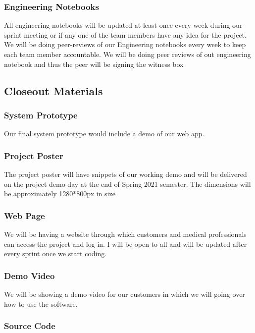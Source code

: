 \subsubsection{Engineering Notebooks}

All engineering notebooks will be updated at least once every week during our sprint meeting or if any one of the team members have any idea for the project. We will be doing peer-reviews of our Engineering notebooks every week to keep each team member accountable. We will be doing peer reviews of out engineering notebook and thus the peer will be signing the witness box
\subsection{Closeout Materials}

\subsubsection{System Prototype}
Our final system prototype would include a demo of our web app. 


\subsubsection{Project Poster}
The project poster will have snippets of our working demo and will be delivered on the project demo day at the end of Spring 2021 semester. The dimensions will be approximately 1280*800px in size

\subsubsection{Web Page}

We will be having a website through which customers and medical professionals can access the project and log in. I will be open to all and will be updated after every sprint once we start coding.

\subsubsection{Demo Video}

We will be showing a demo video for our customers in which we will going over how to use the software.

\subsubsection{Source Code}

